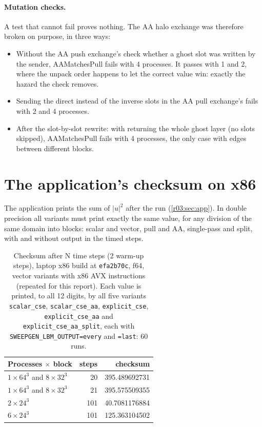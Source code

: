 \paragraph{Mutation checks.} A test that cannot fail proves nothing. The AA halo exchange was
therefore broken on purpose, in three ways:
\begin{itemize}
  \item Without the AA push exchange's check whether a ghost slot was written by the sender,
        AAMatchesPull fails with 4 processes. It passes with 1 and 2, where the unpack order
        happens to let the correct value win: exactly the hazard the check removes.
  \item Sending the direct instead of the inverse slots in the AA pull exchange's 
        fails with 2 and 4 processes.
  \item After the slot-by-slot rewrite: with  returning the whole ghost layer
        (no slots skipped), AAMatchesPull fails with 4 processes, the only case with edges
        between different blocks.
\end{itemize}

\section{The application's checksum on x86}\label{r03:sec:ver-app}

The application prints the sum of $|u|^2$ after the run (\cref{r03:sec:app}). In double
precision all variants must print exactly the same value, for any division of the same domain
into blocks: scalar and vector, pull and AA, single-pass and split, with and without output in
the timed steps.

\begin{table}[htbp]
  \centering\small
  \caption{Checksum after N time steps (2 warm-up steps), laptop x86 build at \texttt{efa2b70c},
    f64, vector variants with x86 AVX instructions (repeated for this report). Each value is
    printed, to all 12 digits, by all five variants \texttt{scalar\_cse}, \texttt{scalar\_cse\_aa},
    \texttt{explicit\_cse}, \texttt{explicit\_cse\_aa} and \texttt{explicit\_cse\_aa\_split}, each
    with \texttt{SWEEPGEN\_LBM\_OUTPUT=every} and \texttt{=last}: 60 runs.}\label{r03:tab:ver-app}
  \begin{tabular}{@{}lrr@{}}
    \toprule
    \textbf{Processes $\times$ block} & \textbf{steps} & \textbf{checksum}\\
    \midrule
    $1\times64^3$ and $8\times32^3$ & 20 & 395.489692731\\
    $1\times64^3$ and $8\times32^3$ & 21 & 395.575509355\\
    $2\times24^3$ & 101 & 40.7081176884\\
    $6\times24^3$ & 101 & 125.363104502\\
    \bottomrule
  \end{tabular}
\end{table}

